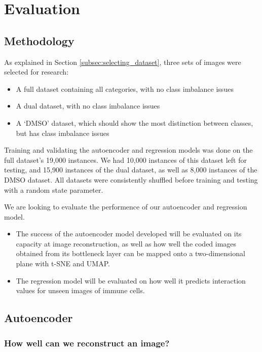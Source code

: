 \chapter{Evaluation}

\section{Methodology}

As explained in Section \ref{subsec:selecting_dataset}, three sets of images were selected for research:

\begin{itemize}
    \item A full dataset containing all categories, with no class imbalance issues
    \item A dual dataset, with no class imbalance issues 
    \item A `DMSO' dataset, which should show the most distinction between classes, but has class imbalance issues
\end{itemize}

Training and validating the autoencoder and regression models was done on the full dataset's 19,000 instances. We had 10,000 instances of this dataset left for testing, and 15,900 instances of the dual dataset, as well as 8,000 instances of the DMSO dataset. All datasets were consistently shuffled before training and testing with a random state parameter.

We are looking to evaluate the performence of our autoencoder and regression model.

\begin{itemize}
    \item The success of the autoencoder model developed will be evaluated on its capacity at image reconstruction, as well as how well the coded images obtained from its bottleneck layer can be mapped onto a two-dimensional plane with t-SNE and UMAP.
    \item The regression model will be evaluated on how well it predicts interaction values for unseen images of immune cells.
\end{itemize}

\section{Autoencoder}

\subsection{How well can we reconstruct an image?}

